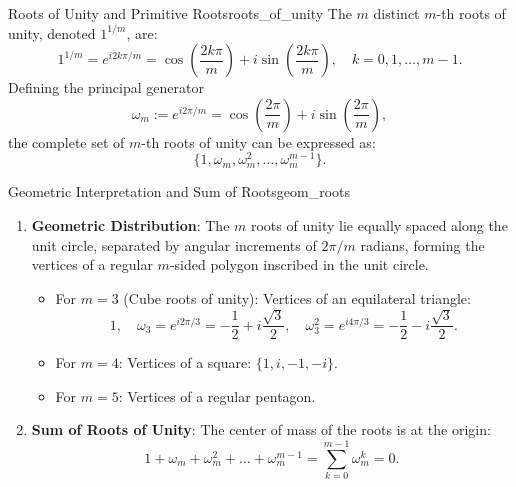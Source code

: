 \begin{definition}{Roots of Unity and Primitive Roots}{roots_of_unity}
The $m$ distinct $m$-th roots of unity, denoted $1^{1/m}$, are:
\begin{equation}
1^{1/m} = e^{i 2k\pi/m} = \cos\left(\frac{2k\pi}{m}\right) + i \sin\left(\frac{2k\pi}{m}\right), \quad k = 0, 1, \dots, m-1.
\end{equation}
Defining the principal generator
\begin{equation}
\omega_m := e^{i 2\pi/m} = \cos\left(\frac{2\pi}{m}\right) + i \sin\left(\frac{2\pi}{m}\right),
\end{equation}
the complete set of $m$-th roots of unity can be expressed as:
\begin{equation}
\{1, \omega_m, \omega_m^2, \dots, \omega_m^{m-1}\}.
\end{equation}
\end{definition}

\begin{proposition}{Geometric Interpretation and Sum of Roots}{geom_roots}
\begin{enumerate}
    \item \textbf{Geometric Distribution}: The $m$ roots of unity lie equally spaced along the unit circle, separated by angular increments of $2\pi/m$ radians, forming the vertices of a regular $m$-sided polygon inscribed in the unit circle.
    \begin{itemize}
        \item For $m = 3$ (Cube roots of unity): Vertices of an equilateral triangle:
        \begin{equation}
        1, \quad \omega_3 = e^{i 2\pi/3} = -\frac{1}{2} + i\frac{\sqrt{3}}{2}, \quad \omega_3^2 = e^{i 4\pi/3} = -\frac{1}{2} - i\frac{\sqrt{3}}{2}.
        \end{equation}
        \item For $m = 4$: Vertices of a square: $\{1, i, -1, -i\}$.
        \item For $m = 5$: Vertices of a regular pentagon.
    \end{itemize}
    \item \textbf{Sum of Roots of Unity}: The center of mass of the roots is at the origin:
    \begin{equation}
    1 + \omega_m + \omega_m^2 + \dots + \omega_m^{m-1} = \sum_{k=0}^{m-1} \omega_m^k = 0.
    \end{equation}
\end{enumerate}
\end{proposition}


